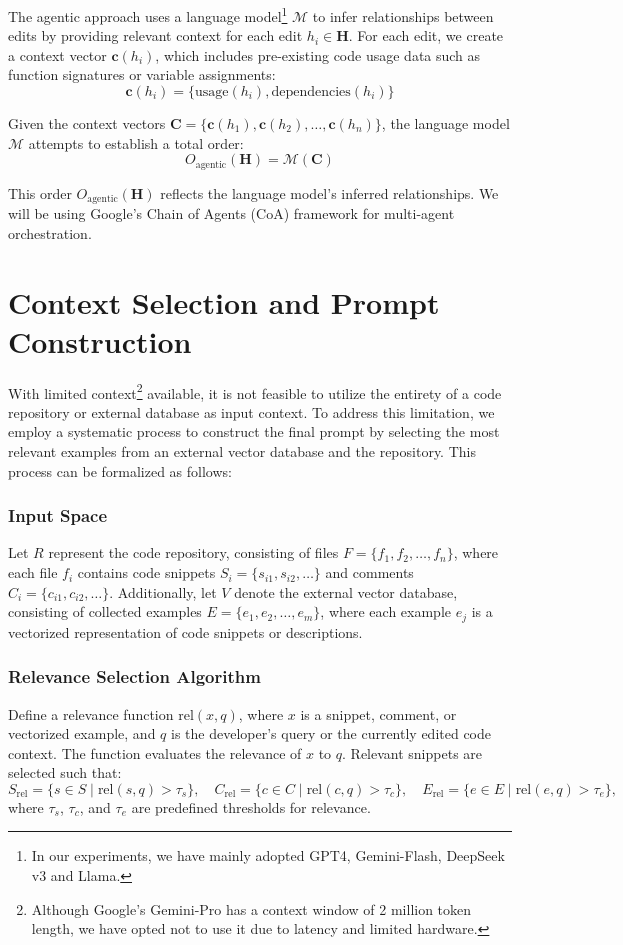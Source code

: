 The agentic approach uses a language model\footnote{In our experiments, we have mainly adopted GPT4, Gemini-Flash, DeepSeek v3 and Llama.} \( \mathcal{M} \) to infer relationships between edits by providing relevant context for each edit \( h_i \in \mathbf{H} \). For each edit, we create a context vector \( \mathbf{c}(h_i) \), which includes pre-existing code usage data such as function signatures or variable assignments:
\[
\mathbf{c}(h_i) = \{ \text{usage}(h_i), \text{dependencies}(h_i) \}
\]

Given the context vectors \( \mathbf{C} = \{\mathbf{c}(h_1), \mathbf{c}(h_2), \dots, \mathbf{c}(h_n)\} \), the language model \( \mathcal{M} \) attempts to establish a total order:
\[
O_{\text{agentic}}(\mathbf{H}) = \mathcal{M}(\mathbf{C})
\]

This order \( O_{\text{agentic}}(\mathbf{H}) \) reflects the language model's inferred relationships. We will be using Google's Chain of Agents (CoA) framework for multi-agent orchestration.

\section{Context Selection and Prompt Construction}

With limited context\footnote{Although Google's Gemini-Pro has a context window of 2 million token length, we have opted not to use it due to latency and limited hardware.} available, it is not feasible to utilize the entirety of a code repository or external database as input context. To address this limitation, we employ a systematic process to construct the final prompt by selecting the most relevant examples from an external vector database and the repository. This process can be formalized as follows:

\subsubsection{Input Space}
Let \( R \) represent the code repository, consisting of files \( F = \{f_1, f_2, \ldots, f_n\} \), where each file \( f_i \) contains code snippets \( S_i = \{s_{i1}, s_{i2}, \ldots\} \) and comments \( C_i = \{c_{i1}, c_{i2}, \ldots\} \). Additionally, let \( V \) denote the external vector database, consisting of collected examples \( E = \{e_1, e_2, \ldots, e_m\} \), where each example \( e_j \) is a vectorized representation of code snippets or descriptions.

\subsubsection{Relevance Selection Algorithm}
Define a relevance function \( \text{rel}(x, q) \), where \( x \) is a snippet, comment, or vectorized example, and \( q \) is the developer's query or the currently edited code context. The function evaluates the relevance of \( x \) to \( q \). Relevant snippets are selected such that:
\[
S_{\text{rel}} = \{s \in S \mid \text{rel}(s, q) > \tau_s\}, \quad C_{\text{rel}} = \{c \in C \mid \text{rel}(c, q) > \tau_c\}, \quad E_{\text{rel}} = \{e \in E \mid \text{rel}(e, q) > \tau_e\},
\]
where \( \tau_s \), \( \tau_c \), and \( \tau_e \) are predefined thresholds for relevance.

